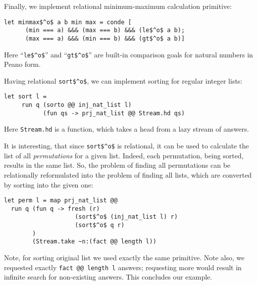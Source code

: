 Finally, we implement relational minimum-maximum calculation
primitive:

\begin{lstlisting}[mathescape=true]
   let minmax$^o$ a b min max = conde [
      (min === a) &&& (max === b) &&& (le$^o$ a b);
      (max === a) &&& (min === b) &&& (gt$^o$ a b)]
\end{lstlisting}

Here ``\lstinline[mathescape=true]{le$^o$}'' and ``\lstinline[mathescape=true]{gt$^o$}'' are
built-in comparison goals for natural numbers in Peano form.

Having relational \lstinline[mathescape=true]{sort$^o$}, we can implement 
sorting for regular integer lists:

\begin{lstlisting}[mathescape=true]
   let sort l =
     run q (sorto @@ inj_nat_list l)
           (fun qs -> prj_nat_list @@ Stream.hd qs)
\end{lstlisting}

Here \lstinline{Stream.hd} is a function, which takes a head from a 
lazy stream of answers. 

It is interesting, that since \lstinline[mathescape=true]{sort$^o$} is
relational, it can be used to calculate the list of all \emph{permutations}
for a given list. Indeed, each permutation, being sorted, results in the same list. 
So, the problem of finding all permutations can be relationally reformulated into 
the problem of finding all lists, which are converted by sorting into the given one:

\begin{lstlisting}[mathescape=true]
let perm l = map prj_nat_list @@
  run q (fun q -> fresh (r)
                    (sort$^o$ (inj_nat_list l) r) 
                    (sort$^o$ q r)
        )
        (Stream.take ~n:(fact @@ length l))
\end{lstlisting}

Note, for sorting original list we used exactly the same primitive. Note also, 
we requested exactly \lstinline{fact @@ length l} answers; requesting more
would result in infinite search for non-existing answers. This concludes our example.

